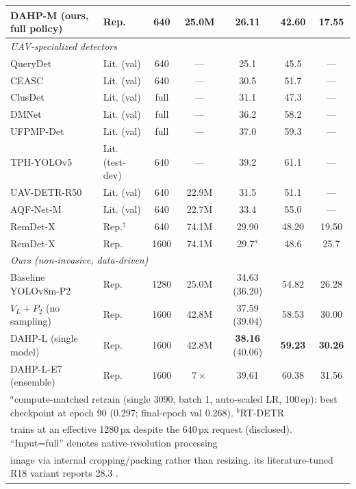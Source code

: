 \documentclass[journal]{IEEEtran}
\newcommand{\remdet}{RemDet-X}
\newcommand{\dahpL}{DAHP-L}
\begin{document}
\begin{table}[!t]
\begin{tabular}{llccccc}
DAHP-M (ours, full policy) & Rep. & 640 & 25.0M & 26.11 & 42.60 & 17.55 \\
\midrule
\multicolumn{7}{l}{\emph{UAV-specialized detectors}}\\
QueryDet \cite{querydet} & Lit. (val) & 640 & --- & 25.1 & 45.5 & --- \\
CEASC \cite{ceasc} & Lit. (val) & 640 & --- & 30.5 & 51.7 & --- \\
ClusDet \cite{clusdet} & Lit. (val) & full & --- & 31.1 & 47.3 & --- \\
DMNet \cite{dmnet} & Lit. (val) & full & --- & 36.2 & 58.2 & --- \\
UFPMP-Det \cite{ufpmp} & Lit. (val) & full & --- & 37.0 & 59.3 & --- \\
TPH-YOLOv5 \cite{tph} & Lit. (test-dev) & 640 & --- & 39.2 & 61.1 & --- \\
UAV-DETR-R50 \cite{uavdetr} & Lit. (val) & 640 & 22.9M & 31.5 & 51.1 & --- \\
AQF-Net-M \cite{aqfnet} & Lit. (val) & 640 & 22.7M & 33.4 & 55.0 & --- \\
\remdet{} \cite{remdet} & Rep.$^\dagger$ & 640 & 74.1M & 29.90 & 48.20 & 19.50 \\
\remdet{} & Rep. & 1600 & 74.1M & 29.7$^{a}$ & 48.6 & 25.7 \\
\midrule
\multicolumn{7}{l}{\emph{Ours (non-invasive, data-driven)}}\\
Baseline YOLOv8m-P2 & Rep. & 1280 & 25.0M & 34.63 (36.20) & 54.82 & 26.28 \\
$V_L{+}P_2$ (no sampling) & Rep. & 1600 & 42.8M & 37.59 (39.04) & 58.53 & 30.00 \\
\dahpL{} (single model) & Rep. & 1600 & 42.8M & \textbf{38.16} (40.06) & \textbf{59.23} & \textbf{30.26} \\
\dahpL{}-E7 (ensemble) \cite{wbf} & Rep. & 1600 & $7{\times}$ & 39.61 & 60.38 & 31.56 \\
\bottomrule
\multicolumn{7}{l}{\footnotesize $^{a}$compute-matched retrain (single 3090, batch 1, auto-scaled LR, 100\,ep): best checkpoint at epoch 90 (0.297; final-epoch val 0.268). $^{b}$RT-DETR}\\
\multicolumn{7}{l}{\footnotesize trains at an effective 1280\,px despite the 640\,px request (disclosed). ``Input=full'' denotes native-resolution processing}\\
\multicolumn{7}{l}{\footnotesize image via internal cropping/packing rather than resizing. its literature-tuned R18 variant reports 28.3 \cite{rtdetr}.}\\

\end{tabular}
\end{table}
\end{document}
